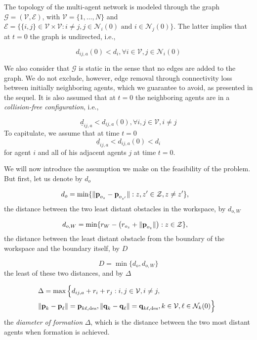 The topology of the multi-agent network is modeled through the graph
$\mathcal{G} = (\mathcal{V},\mathcal{E})$, with $\mathcal{V}=\{1,\dots,N\}$ and
$\mathcal{E}=\big\{\{i,j\}\in\mathcal{V}\times\mathcal{V} : i \neq j, j\in\mathcal{N}_i(0) \text{ and } i\in\mathcal{N}_j(0)\big\}$.
The latter implies that at $t=0$ the graph is undirected, i.e.,

\begin{equation} \label{eq:initially_connected}
  d_{ij,a}(0) < d_i, \forall i \in \mathcal{V}, j \in \mathcal{N}_i(0)
\end{equation}

We also consider that $\mathcal{G}$ is static in the sense that no edges are
added to the graph. We do not exclude, however, edge removal through
connectivity loss between initially neighboring agents, which we guarantee
to avoid, as presented in the sequel. It is also assumed that at $t=0$ the
neighboring agents are in a \textit{collision-free configuration}, i.e.,

\begin{equation}
  \underline{d}_{ij, a} < d_{ij,a}(0), \forall i,j \in \mathcal{V}, i \neq j
\label{eq:initially_coll_free}
\end{equation}
To capitulate, we assume that at time $t=0$
$$\underline{d}_{ij,a} < d_{ij,a}(0) < d_i$$
for agent $i$ and all of his adjacent agents $j$ at time $t=0$.

We will now introduce the assumption we make on the feasibility of the
problem. But first, let us denote by $d_o$

\begin{align*}
  d_o &= \min\{\| \bm{\mathbf{p}}_{o_z} - \bm{\mathbf{p}}_{o_{z'}}\| : z,z' \in \mathcal{Z}, z \neq z' \},
\end{align*}
the distance between the two least distant obstacles in the workspace,
by $d_{o,W}$

\begin{align*}
  d_{o,W} &= \min\{r_W - \left( r_{o_z} + \| \bm{\mathbf{p}}_{o_z} \| \right) : z \in \mathcal{Z}\},
\end{align*}
the distance between the least distant obstacle from the boundary of the
workspace and the boundary itself, by $D$

\begin{equation*}
  D = \min\{d_o, d_{o,W}\}
\end{equation*}
the least of these two distances, and by $\Delta$

\begin{align*}
  &\hspace{-2mm} \Delta =  \max\Big\{d_{ij, a}+r_i+r_j: i, j \in \mathcal{V}, i \neq j, \notag \\
  &\hspace{-2mm} \| \vect{p}_k - \vect{p}_\ell \| = \vect{p}_{k \ell,\text{des}},
  \|\vect{q}_k - \vect{q}_\ell\| = \vect{q}_{k \ell,\text{des}},
  k \in \mathcal{V},
  \ell \in \mathcal{N}_k(0)\Big\}
\end{align*}
the \emph{diameter of formation} $\Delta$, which is the
distance between the two most distant agents when formation is achieved.

